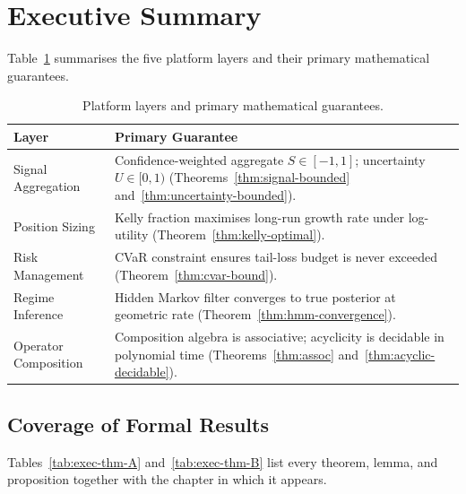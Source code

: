 \documentclass[12pt,openany]{book}
\numberwithin{equation}{chapter}
\theoremstyle{plain}
\theoremstyle{definition}
\theoremstyle{remark}
\newenvironment{executivesummary}{%
  \chapter*{Executive Summary}
}{%
}
\numberwithin{equation}{chapter}
\theoremstyle{plain}
\begin{document}
\begin{executivesummary}
Table~\ref{tab:exec-layer-summary} summarises the five platform layers
and their primary mathematical guarantees.

\begin{table}[H]
  \centering
  \caption{Platform layers and primary mathematical guarantees.}
  \label{tab:exec-layer-summary}
  \begin{tabularx}{\linewidth}{@{} l X @{}}
    \toprule
    \textbf{Layer} & \textbf{Primary Guarantee} \\
    \midrule
    Signal Aggregation &
      Confidence-weighted aggregate $S\in[-1,1]$; uncertainty $U\in[0,1)$
      (Theorems~\ref{thm:signal-bounded} and~\ref{thm:uncertainty-bounded}). \\
    Position Sizing &
      Kelly fraction maximises long-run growth rate under log-utility
      (Theorem~\ref{thm:kelly-optimal}). \\
    Risk Management &
      CVaR constraint ensures tail-loss budget is never exceeded
      (Theorem~\ref{thm:cvar-bound}). \\
    Regime Inference &
      Hidden Markov filter converges to true posterior at geometric rate
      (Theorem~\ref{thm:hmm-convergence}). \\
    Operator Composition &
      Composition algebra is associative; acyclicity is decidable
      in polynomial time (Theorems~\ref{thm:assoc} and~\ref{thm:acyclic-decidable}). \\
    \bottomrule
  \end{tabularx}
\end{table}

\section*{Coverage of Formal Results}

Tables~\ref{tab:exec-thm-A} and~\ref{tab:exec-thm-B} list every theorem,
lemma, and proposition together with the chapter in which it appears.


\end{executivesummary}
\end{document}

